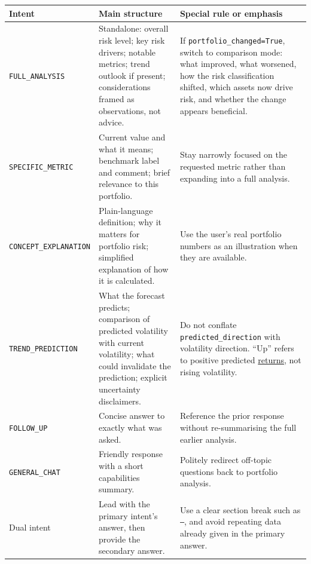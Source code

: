 \begin{table}[htbp]
\centering
\footnotesize
\setlength{\tabcolsep}{5pt}
\renewcommand{\arraystretch}{1.15}
\begin{tabularx}{\textwidth}{|>{\ttfamily}p{3.0cm}|>{\raggedright\arraybackslash}X|>{\raggedright\arraybackslash}p{4.6cm}|}
\hline
\textnormal{Intent} & \textnormal{Main structure} & \textnormal{Special rule or emphasis} \\
\hline
\texttt{FULL\_ANALYSIS} &
Standalone: overall risk level; key risk drivers; notable metrics; trend outlook if present; considerations framed as observations, not advice. &
If \texttt{portfolio\_changed=True}, switch to comparison mode: what improved, what worsened, how the risk classification shifted, which assets now drive risk, and whether the change appears beneficial. \\
\hline

\texttt{SPECIFIC\_METRIC} &
Current value and what it means; benchmark label and comment; brief relevance to this portfolio. &
Stay narrowly focused on the requested metric rather than expanding into a full analysis. \\
\hline

\texttt{CONCEPT\_}\newline\texttt{EXPLANATION} &
Plain-language definition; why it matters for portfolio risk; simplified explanation of how it is calculated. &
Use the user's real portfolio numbers as an illustration when they are available. \\
\hline

\texttt{TREND\_PREDICTION} &
What the forecast predicts; comparison of predicted volatility with current volatility; what could invalidate the prediction; explicit uncertainty disclaimers. &
Do not conflate \texttt{predicted\_direction} with volatility direction. ``Up'' refers to positive predicted \underline{returns}, not rising volatility. \\
\hline

\texttt{FOLLOW\_UP} &
Concise answer to exactly what was asked. &
Reference the prior response without re-summarising the full earlier analysis. \\
\hline

\texttt{GENERAL\_CHAT} &
Friendly response with a short capabilities summary. &
Politely redirect off-topic questions back to portfolio analysis. \\
\hline

\textnormal{Dual intent} &
Lead with the primary intent's answer, then provide the secondary answer. &
Use a clear section break such as \texttt{---}, and avoid repeating data already given in the primary answer. \\
\hline

\end{tabularx}
\end{table}

